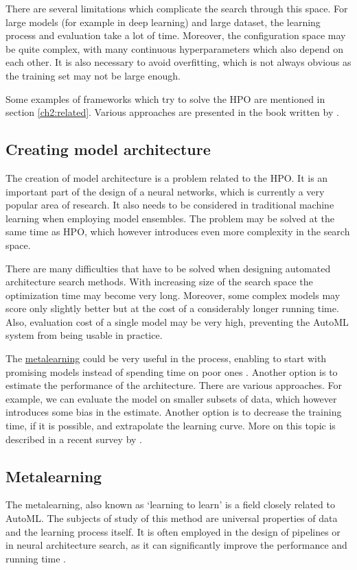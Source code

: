 There are several limitations which complicate the search through this space.
For large models (for example in deep learning) and large dataset, the
learning process and evaluation take a lot of time. Moreover, the
configuration space may be quite complex, with many continuous hyperparameters
which also depend on each other. It is also necessary to avoid overfitting,
which is not always obvious as the training set may not be large enough.

Some examples of frameworks which try to solve the HPO are mentioned in section
\ref{ch2:related}. Various approaches are presented in the book written by
\cite{automl_book}.

\subsection{Creating model architecture}
The creation of model architecture is a problem related to the HPO. It is an
important part of the design of a neural networks, which is currently a very
popular area of research. It also needs to be considered in traditional machine
learning when employing model ensembles. The problem may be solved at the same
time as HPO, which however introduces even more complexity in the search space.

There are many difficulties that have to be solved when designing automated
architecture search methods. With increasing size of the search space 
the optimization time may become very long.
Moreover, some complex models may score only slightly better
but at the cost of a considerably longer running time. Also, evaluation cost of
a single model may be very high, preventing the AutoML system from being usable
in practice.

The \hyperref[metalearning]{metalearning} could be very useful in the process,
enabling to start with promising models instead of spending time on poor ones
\citep{DBLP:journals/corr/abs-1810-03548}.
Another option is to estimate the performance of the architecture. There are
various approaches. For example, we can evaluate the model on smaller subsets of
data, which however introduces some bias in the estimate. Another option is to
decrease the training time, if it is possible, and extrapolate the learning
curve. More on this topic is described in a recent survey by
\cite{2018arXiv180805377E}.

\subsection{Metalearning} \label{metalearning}
The metalearning, also known as `learning to learn' is a field closely related
to AutoML. The subjects of study of this method are universal properties of 
data and the learning process itself. It is often employed in the design of
pipelines or in neural architecture search, as it can significantly
improve the performance and running time
\citep{DBLP:journals/corr/abs-1810-03548}.

